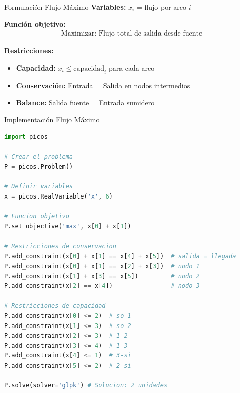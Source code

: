 \documentclass{beamer}
\begin{document}
\begin{frame}{Formulación Flujo Máximo}
    \textbf{Variables:} $x_i$ = flujo por arco $i$
    
    \vspace{1em}
    \textbf{Función objetivo:}
    \begin{align*}
        \text{Maximizar: } \text{Flujo total de salida desde fuente}
    \end{align*}
    
    \textbf{Restricciones:}
    \begin{itemize}
        \item \textbf{Capacidad:} $x_i \leq \text{capacidad}_i$ para cada arco
        \item \textbf{Conservación:} Entrada = Salida en nodos intermedios
        \item \textbf{Balance:} Salida fuente = Entrada sumidero
    \end{itemize}
\end{frame}

\begin{frame}[fragile]{Implementación Flujo Máximo}
    \begin{lstlisting}[language=Python]
import picos

# Crear el problema
P = picos.Problem()

# Definir variables
x = picos.RealVariable('x', 6)

# Funcion objetivo
P.set_objective('max', x[0] + x[1])

# Restricciones de conservacion
P.add_constraint(x[0] + x[1] == x[4] + x[5])  # salida = llegada
P.add_constraint(x[0] + x[1] == x[2] + x[3])  # nodo 1
P.add_constraint(x[1] + x[3] == x[5])         # nodo 2
P.add_constraint(x[2] == x[4])                # nodo 3

# Restricciones de capacidad
P.add_constraint(x[0] <= 2)  # so-1
P.add_constraint(x[1] <= 3)  # so-2
P.add_constraint(x[2] <= 3)  # 1-2
P.add_constraint(x[3] <= 4)  # 1-3
P.add_constraint(x[4] <= 1)  # 3-si
P.add_constraint(x[5] <= 2)  # 2-si

P.solve(solver='glpk') # Solucion: 2 unidades
    \end{lstlisting}
\end{frame}
\end{document}
